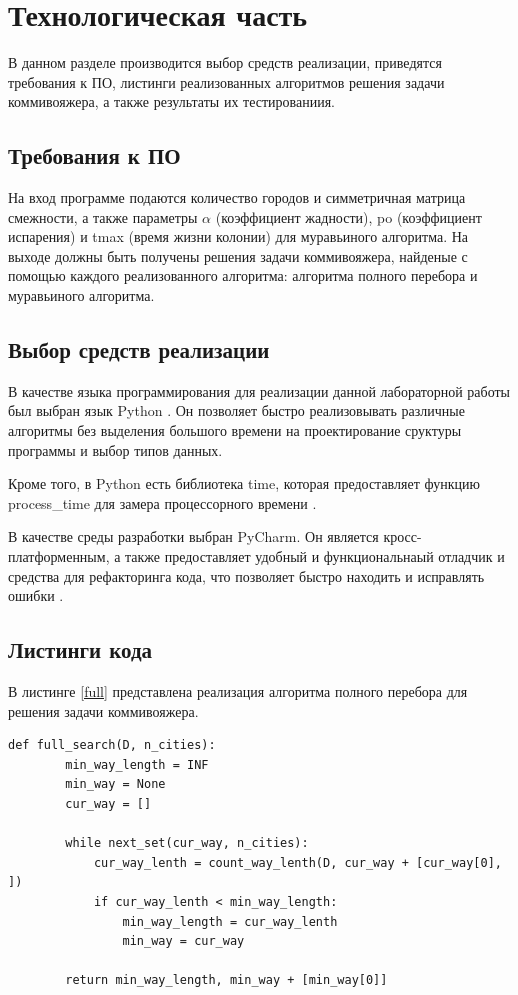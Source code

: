 \chapter{Технологическая часть}

В данном разделе производится выбор средств реализации, приведятся требования к ПО, листинги реализованных алгоритмов решения задачи коммивояжера, а также результаты их тестированиия.

\section{Требования к ПО}

На вход программе подаются количество городов и симметричная матрица смежности, а также параметры $\alpha$ (коэффициент жадности), po (коэффициент испарения) и tmax (время жизни колонии) для муравьиного алгоритма. На выходе должны быть получены решения задачи коммивояжера, найденые с помощью каждого реализованного алгоритма: алгоритма полного перебора и муравьиного алгоритма. 

\section{Выбор средств реализации}

В качестве языка программирования для реализации данной лабораторной работы был выбран язык Python  \cite{PythonBook}. Он позволяет быстро реализовывать различные алгоритмы без выделения большого времени на проектирование сруктуры программы и выбор типов данных. 

Кроме того, в Python есть библиотека time, которая предоставляет функцию process\_time для замера процессорного времени \cite{process_time_text}.

В качестве среды разработки выбран PyCharm. Он является кросс-платформенным, а также предоставляет удобный и функциональнаый отладчик и средства для рефакторинга кода, что позволяет быстро находить и исправлять ошибки \cite{pycharm}.

\section{Листинги кода}

В листинге \ref{full} представлена реализация алгоритма полного перебора для решения задачи коммивояжера.

\clearpage
\begin{lstlisting}[caption=Алгоритм полного перебора,
	label={full}]
	def full_search(D, n_cities):
		min_way_length = INF
		min_way = None
		cur_way = []
		
		while next_set(cur_way, n_cities):
			cur_way_lenth = count_way_lenth(D, cur_way + [cur_way[0], ])
			if cur_way_lenth < min_way_length:
				min_way_length = cur_way_lenth
				min_way = cur_way
		
		return min_way_length, min_way + [min_way[0]]
\end{lstlisting}

